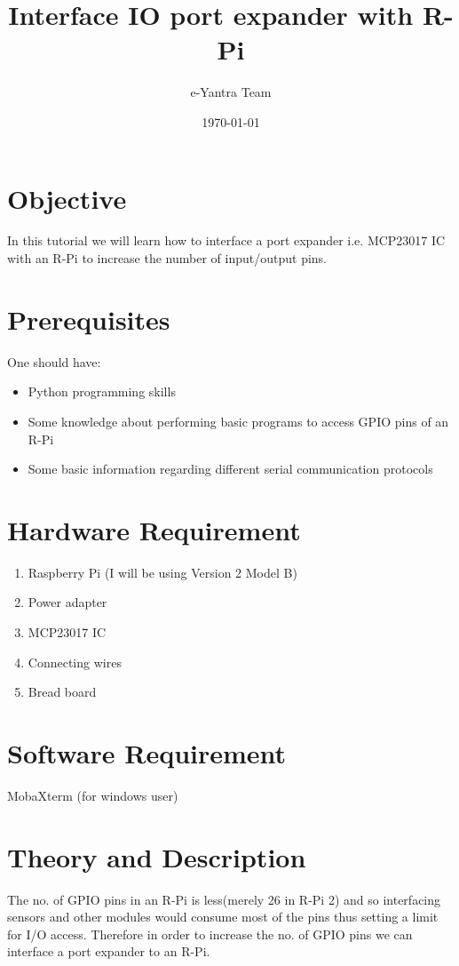 \documentclass[11pt,a4paper]{article}
\title{Interface IO port expander with R-Pi}
\author{e-Yantra Team}
\date{\today}
\begin{document}
	\maketitle
	\newpage
	\tableofcontents
	\newpage
	\section{Objective}
	In this tutorial we will learn how to interface a port expander i.e. MCP23017 IC with an R-Pi to increase the number of input/output pins.
	\section{Prerequisites}
	One should have:
	\begin{itemize}
		\item Python programming skills
		\item Some knowledge about performing basic programs to access GPIO pins of an R-Pi
		\item Some basic information regarding different serial communication \newline protocols
	\end{itemize}
	\section{Hardware Requirement}
	\begin{enumerate}
		\item Raspberry Pi (I will be using Version 2 Model B)
		\item Power adapter
		\item MCP23017 IC
		\item Connecting wires
		\item Bread board
	\end{enumerate}
	\section{Software Requirement}
	MobaXterm (for windows user) 
	
	\newpage
	\section{Theory and Description}
	The no. of GPIO pins in an R-Pi is less(merely 26 in R-Pi 2) and so interfacing sensors and other modules would consume most of the pins thus setting a limit for I/O access. Therefore in order to increase the no. of GPIO pins we can interface a port expander to an R-Pi.
	
\end{document}
